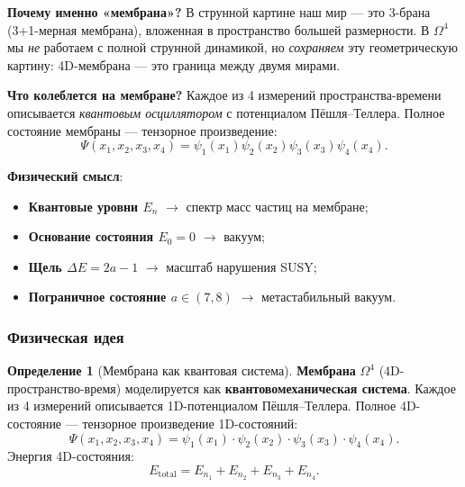 \documentclass[11pt,a4paper]{article}
\newcommand{\Om}{\ensuremath{\Omega^4}}
\theoremstyle{definition}
\newtheorem{definition}[theorem]{Определение}
\begin{document}
\medskip\noindent
\textbf{Почему именно «мембрана»?} В струнной картине наш мир — 
это 3-брана (3+1-мерная мембрана), вложенная в пространство 
большей размерности. В $\Om$ мы \emph{не} работаем с полной 
струнной динамикой, но \emph{сохраняем} эту геометрическую картину: 
4D-мембрана — это граница между двумя мирами.

\medskip\noindent
\textbf{Что колеблется на мембране?} Каждое из 4 измерений 
пространства-времени описывается \emph{квантовым осциллятором} 
с потенциалом Пёшля–Теллера. Полное состояние мембраны — 
тензорное произведение:
\begin{equation}
    \Psi(x_1, x_2, x_3, x_4) = \psi_1(x_1)\psi_2(x_2)\psi_3(x_3)\psi_4(x_4).
\end{equation}

\medskip\noindent
\textbf{Физический смысл}: 
\begin{itemize}
    \item \textbf{Квантовые уровни $E_n$} $\to$ спектр масс частиц на мембране;
    \item \textbf{Основание состояния $E_0 = 0$} $\to$ вакуум;
    \item \textbf{Щель $\Delta E = 2a-1$} $\to$ масштаб нарушения SUSY;
    \item \textbf{Пограничное состояние $a \in (7, 8)$} $\to$ метастабильный вакуум.
\end{itemize}
                                  
\subsubsection{Физическая идея}

\begin{definition}[Мембрана как квантовая система]
\label{def:membrane-quantum}
\textbf{Мембрана} $\Om$ (4D-пространство-время)
моделируется как \textbf{квантовомеханическая система}.
Каждое из 4 измерений описывается
1D-потенциалом Пёшля--Теллера.
Полное 4D-состояние --- тензорное произведение
1D-состояний:
\begin{equation}
    \boxed{
    \Psi(x_1, x_2, x_3, x_4) =
    \psi_1(x_1) \cdot \psi_2(x_2) \cdot \psi_3(x_3) \cdot \psi_4(x_4).
    }
    \label{eq:membrane-psi-4D}
\end{equation}
Энергия 4D-состояния:
\begin{equation}
    \boxed{
    E_{\text{total}} = E_{n_1} + E_{n_2} + E_{n_3} + E_{n_4}.
    }
    \label{eq:membrane-E-4D}
\end{equation}
\end{definition}
\end{document}
